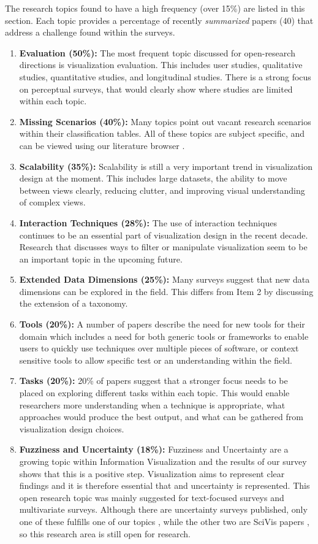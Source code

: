 The research topics found to have a high frequency (over 15\%) are listed in this section. Each topic provides a percentage of recently \textit{summarized} papers (40) that address a challenge found within the surveys.
\begin{enumerate}
\item \textbf{Evaluation (50\%):} The most frequent topic discussed for open-research directions is visualization evaluation. This includes user studies, qualitative studies, quantitative studies, and longitudinal studies. There is a strong focus on perceptual surveys, that would clearly show where studies are limited within each topic.
\item \textbf{Missing Scenarios (40\%):} Many topics point out vacant research scenarios within their classification tables. All of these topics are subject specific, and can be viewed using our literature browser \cite{surVis}.
\item \textbf{Scalability (35\%):} Scalability is still a very important trend in visualization design at the moment. This includes large datasets, the ability to move between views clearly, reducing clutter, and improving visual  understanding of complex views.
\item \textbf{Interaction Techniques (28\%):} The use of interaction techniques continues to be an essential part of visualization design in the recent decade. Research that discusses ways to filter or manipulate visualization seem to be an important topic in the upcoming future.
\item \textbf{Extended Data Dimensions (25\%):} Many surveys suggest that new data dimensions can be explored in the field. This differs from Item 2 by discussing the extension of a taxonomy.
\item \textbf{Tools (20\%):} A number of papers describe the need for new tools for their domain which includes a need for both generic tools or frameworks to enable users to quickly use techniques over multiple pieces of software, or context sensitive tools to allow specific test or an understanding within the field.
\item \textbf{Tasks (20\%):} 20\% of papers suggest that a stronger focus needs to be placed on exploring different tasks within each topic. This would enable researchers more understanding when a technique is appropriate, what approaches would produce the best output, and what can be gathered from visualization design choices.
\item \textbf{Fuzziness and Uncertainty (18\%):} Fuzziness and Uncertainty are a growing topic within Information Visualization and the results of our survey shows that this is a positive step. Visualization aims to represent clear findings and it is therefore essential that and uncertainty is represented. This open research topic was mainly suggested for text-focused surveys and multivariate surveys. Although there are uncertainty surveys published, only one of these fulfills one of our topics \cite{dasgupta2012conceptualizing}, while the other two are SciVis papers \cite{uncertain,brodlie2012}, so this research area is still open for research.
\end{enumerate}


